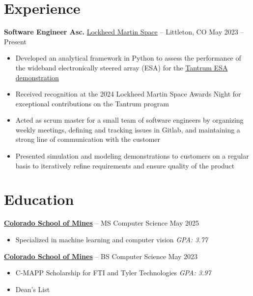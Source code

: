 \documentclass[11pt]{article}       %
\begin{document}
\section*{Experience}
\textbf{Software Engineer Asc.} \href{https://www.lockheedmartin.com/en-us/capabilities/space.html}{Lockheed Martin Space}
-- Littleton, CO \hfill May 2023 -- Present \\
\vspace{-9pt}
\begin{itemize}
  \item Developed an analytical framework in Python to assess the performance of
        the wideband electronically steered array (ESA) for the
        \href{https://news.lockheedmartin.com/ESA_payload_demonstrator}{Tantrum ESA demonstration}
  \item Received recognition at the 2024 Lockheed Martin Space Awards Night for
        exceptional contributions on the Tantrum program
  \item Acted as scrum master for a small team of software engineers by
        organizing weekly meetings, defining and tracking issues in Gitlab, and
        maintaining a strong line of communication with the customer
  \item Presented simulation and modeling demonstrations to customers on a
        regular basis to iteratively refine requirements and ensure quality of
        the product
\end{itemize}

\vspace{-18.5pt}

\section*{Education}
\textbf{\href{https://cs.mines.edu}{Colorado School of Mines}} -- MS Computer Science \hfill May 2025 \\
\vspace{-11.5pt}
\begin{itemize}
  \itemsep -0.5em
  \item Specialized in machine learning and computer vision \hfill \textit{GPA: 3.77}
\end{itemize}

\vspace{-6.5pt}

\textbf{\href{https://cs.mines.edu}{Colorado School of Mines}} -- BS Computer Science \hfill May 2023 \\
\vspace{-11.5pt}
\begin{itemize}
  \itemsep -0.5em
  \item C-MAPP Scholarship for FTI and Tyler Technologies \hfill \textit{GPA: 3.97}
  \item Dean's List \hfill
\end{itemize}
\end{document}
